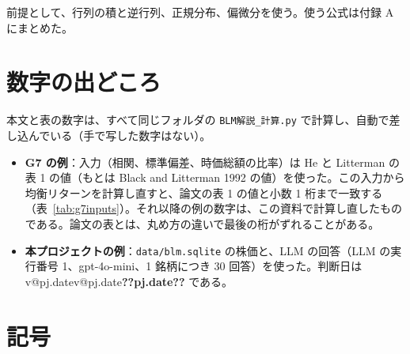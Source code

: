 \documentclass[xelatex,ja=standard,jafont=hiragino-pron,a4paper,11pt,openany]{bxjsreport}
\makeatletter
\newcommand{\V}[1]{\ifcsname v@#1\endcsname\csname v@#1\endcsname\else\textbf{??#1??}\fi}
\newcommand{\code}[1]{\texttt{#1}}
\newcommand{\tabref}[1]{表~\ref{#1}}
\makeatother
\begin{document}
前提として、行列の積と逆行列、正規分布、偏微分を使う。使う公式は付録 A にまとめた。

\section*{数字の出どころ}

本文と表の数字は、すべて同じフォルダの \code{BLM解説\_計算.py} で計算し、自動で差し込んでいる（手で写した数字はない）。

\begin{itemize}
\item \textbf{G7 の例}：入力（相関、標準偏差、時価総額の比率）は He と Litterman の表 1 の値（もとは Black and Litterman 1992 の値）を使った。この入力から均衡リターンを計算し直すと、論文の表 1 の値と小数 1 桁まで一致する（\tabref{tab:g7inputs}）。それ以降の例の数字は、この資料で計算し直したものである。論文の表とは、丸め方の違いで最後の桁がずれることがある。
\item \textbf{本プロジェクトの例}：\code{data/blm.sqlite} の株価と、LLM の回答（LLM の実行番号 1、gpt-4o-mini、1 銘柄につき 30 回答）を使った。判断日は \V{pj.date} である。
\end{itemize}

\section*{記号}
\end{document}
